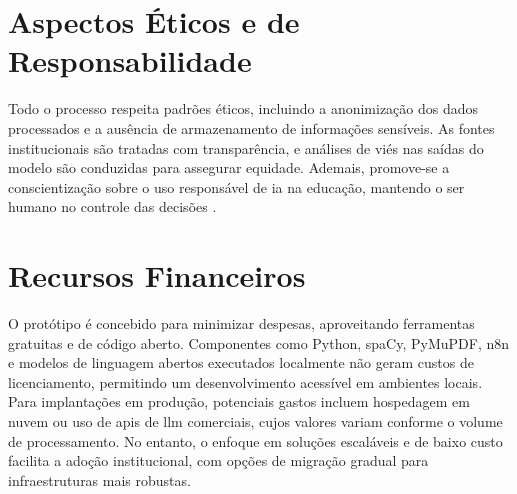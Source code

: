 \section{Aspectos Éticos e de Responsabilidade}
Todo o processo respeita padrões éticos, incluindo a anonimização dos dados processados e a ausência de armazenamento de informações sensíveis. As fontes institucionais são tratadas com transparência, e análises de viés nas saídas do modelo são conduzidas para assegurar equidade. Ademais, promove-se a conscientização sobre o uso responsável de \gls{ia} na educação, mantendo o ser humano no controle das decisões \cite{USDeptEd2023}.

\section{Recursos Financeiros}
O protótipo é concebido para minimizar despesas, aproveitando ferramentas gratuitas e de código aberto. Componentes como Python, spaCy, PyMuPDF, n8n e modelos de linguagem abertos executados localmente não geram custos de licenciamento, permitindo um desenvolvimento acessível em ambientes locais. Para implantações em produção, potenciais gastos incluem hospedagem em nuvem ou uso de \glspl{api} de \gls{llm} comerciais, cujos valores variam conforme o volume de processamento. No entanto, o enfoque em soluções escaláveis e de baixo custo facilita a adoção institucional, com opções de migração gradual para infraestruturas mais robustas.
